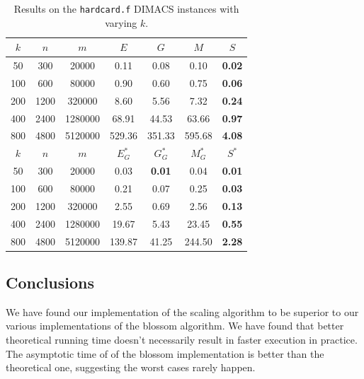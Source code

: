\begin{table}
\centering
\begin{tabular}{ccc|cccc}
$k$ & $n$ & $m$ & $E$ & $G$ & $M$ & $S$ \\
\hline
50 & 300 & 20000 & 0.11 & 0.08 & 0.10 & \textbf{0.02} \\
100 & 600 & 80000 & 0.90 & 0.60 & 0.75 & \textbf{0.06} \\
200 & 1200 & 320000 & 8.60 & 5.56 & 7.32 & \textbf{0.24} \\
400 & 2400 & 1280000 & 68.91 & 44.53 & 63.66 & \textbf{0.97} \\
800 & 4800 & 5120000 & 529.36 & 351.33 & 595.68 & \textbf{4.08} \\
\hline
$k$ & $n$ & $m$ & $E^*_G$ & $G^*_G$ & $M^*_G$ & $S^*$ \\
\hline
50 & 300 & 20000 & 0.03 & \textbf{0.01} & 0.04 & \textbf{0.01} \\
100 & 600 & 80000 & 0.21 & 0.07 & 0.25 & \textbf{0.03} \\
200 & 1200 & 320000 & 2.55 & 0.69 & 2.56 & \textbf{0.13} \\
400 & 2400 & 1280000 & 19.67 & 5.43 & 23.45 & \textbf{0.55} \\
800 & 4800 & 5120000 & 139.87 & 41.25 & 244.50 & \textbf{2.28} \\
\end{tabular}
\caption{Results on the \texttt{hardcard.f} DIMACS instances with varying $k$.}\label{tab:hardcard}
\end{table}

\subsection{Conclusions}

We have found our implementation of the scaling algorithm to be superior to our various implementations of the blossom algorithm.  We have found that better theoretical running time doesn't necessarily result in faster execution in practice. The asymptotic time of of the blossom implementation is better than the theoretical one, suggesting the worst cases rarely happen. 

